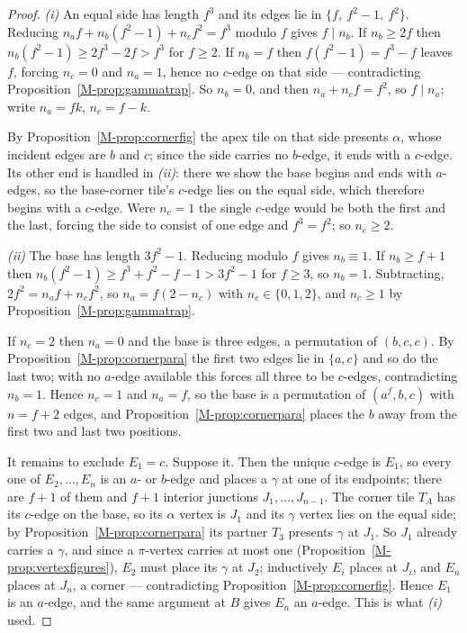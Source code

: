 \documentclass[11pt,reqno]{amsart}
\theoremstyle{plain}
\theoremstyle{definition}
\begin{document}
\begin{proof}
\emph{(i)} An equal side has length $f^3$ and its edges lie in $\{f,\ f^2-1,\ f^2\}$. Reducing
$n_af+n_b(f^2-1)+n_cf^2=f^3$ modulo $f$ gives $f\mid n_b$. If $n_b\ge2f$ then
$n_b(f^2-1)\ge2f^3-2f>f^3$ for $f\ge2$. If $n_b=f$ then $f(f^2-1)=f^3-f$ leaves $f$, forcing
$n_c=0$ and $n_a=1$, hence no $c$-edge on that side --- contradicting
Proposition~\ref{M-prop:gammatrap}. So $n_b=0$, and then $n_a+n_cf=f^2$, so $f\mid n_a$; write
$n_a=fk$, $n_c=f-k$.

By Proposition~\ref{M-prop:cornerfig} the apex tile on that side presents $\alpha$, whose incident
edges are $b$ and $c$; since the side carries no $b$-edge, it ends with a $c$-edge. Its other end is
handled in \emph{(ii)}: there we show the base begins and ends with $a$-edges, so the base-corner
tile's $c$-edge lies on the equal side, which therefore begins with a $c$-edge. Were $n_c=1$ the
single $c$-edge would be both the first and the last, forcing the side to consist of one edge and
$f^3=f^2$; so $n_c\ge2$.

\emph{(ii)} The base has length $3f^2-1$. Reducing modulo $f$ gives $n_b\equiv1$. If $n_b\ge f+1$
then $n_b(f^2-1)\ge f^3+f^2-f-1>3f^2-1$ for $f\ge3$, so $n_b=1$. Subtracting,
$2f^2=n_af+n_cf^2$, so $n_a=f(2-n_c)$ with $n_c\in\{0,1,2\}$, and $n_c\ge1$ by
Proposition~\ref{M-prop:gammatrap}.

If $n_c=2$ then $n_a=0$ and the base is three edges, a permutation of $(b,c,c)$. By
Proposition~\ref{M-prop:cornerpara} the first two edges lie in $\{a,c\}$ and so do the last two; with
no $a$-edge available this forces all three to be $c$-edges, contradicting $n_b=1$. Hence $n_c=1$
and $n_a=f$, so the base is a permutation of $(a^f,b,c)$ with $n=f+2$ edges, and
Proposition~\ref{M-prop:cornerpara} places the $b$ away from the first two and last two positions.

It remains to exclude $E_1=c$. Suppose it. Then the unique $c$-edge is $E_1$, so every one of
$E_2,\dots,E_n$ is an $a$- or $b$-edge and places a $\gamma$ at one of its endpoints; there are
$f+1$ of them and $f+1$ interior junctions $J_1,\dots,J_{n-1}$. The corner tile $T_A$ has its
$c$-edge on the base, so its $\alpha$ vertex is $J_1$ and its $\gamma$ vertex lies on the equal
side; by Proposition~\ref{M-prop:cornerpara} its partner $T_3$ presents $\gamma$ at $J_1$. So $J_1$
already carries a $\gamma$, and since a $\pi$-vertex carries at most one
(Proposition~\ref{M-prop:vertexfigures}), $E_2$ must place its $\gamma$ at $J_2$; inductively $E_i$
places at $J_i$, and $E_n$ places at $J_n$, a corner --- contradicting
Proposition~\ref{M-prop:cornerfig}. Hence $E_1$ is an $a$-edge, and the same argument at $B$ gives
$E_n$ an $a$-edge. This is what \emph{(i)} used.
\end{proof}
\end{document}
